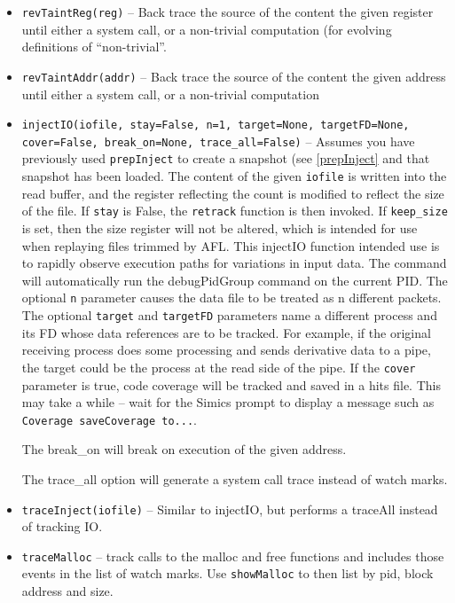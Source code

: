 \documentclass[titlepage]{article}
\begin{document}
\begin{itemize}
\item {\tt revTaintReg(reg)} – Back trace the source of the content the given register until either a system call, or a non-trivial computation (for evolving definitions of “non-trivial”.  

\item {\tt revTaintAddr(addr)} -- Back trace the source of the content the given address until either a system call, or a non-trivial computation

\item {\tt injectIO(iofile, stay=False, n=1, target=None, targetFD=None, cover=False, break\_on=None, trace\_all=False)} -- Assumes you have previously used {\tt prepInject}
to create a snapshot (see \ref{prepInject} and that snapshot has been loaded.
The content of the given {\tt iofile} is written into the read buffer, and the register reflecting 
the count is modified to reflect the size of the file.  If {\tt stay} is False, the {\tt retrack} function is then invoked. If {\tt keep\_size} is
set, then the size register will not be altered, which is intended for use when replaying files trimmed by AFL.
This injectIO function intended use is to rapidly observe execution paths for variations in input data. The command will automatically
run the debugPidGroup command on the current PID. The optional {\tt n} parameter causes the data file to be treated as n different packets.
The optional {\tt target} and {\tt targetFD} parameters name a different process and its FD whose data references are to be tracked.  For example,
if the original receiving process does some processing and sends derivative data to a pipe, the target could be the process at the read side
of the pipe.  If the {\tt cover} parameter is true, code coverage will be tracked and saved in a hits file.  This may take a while -- wait for the
Simics prompt to display a message such as {\tt Coverage saveCoverage to...}.

The break\_on will break on execution of the given address. 

The trace\_all option will generate a system call trace instead of watch marks.

\item {\tt traceInject(iofile)} -- Similar to injectIO, but performs a traceAll instead of tracking IO.

\item{\tt traceMalloc} -- track calls to the malloc and free functions and includes those events in the list of watch marks. Use {\tt showMalloc} to 
then list by pid, block address and size.


\end{itemize}
\end{document}
